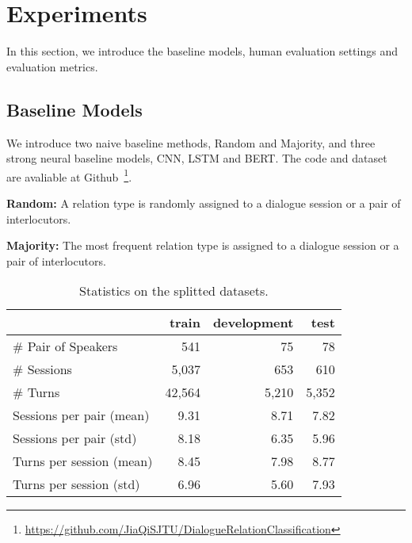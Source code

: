 \documentclass[letterpaper]{article} \usepackage{aaai21}  \usepackage{times}  \usepackage{helvet} \usepackage{courier}  \usepackage[hyphens]{url}  \usepackage{graphicx} \usepackage{xcolor}
\begin{document}
 
\section{Experiments}
\label{experiments}


In this section, we introduce the baseline models, human evaluation settings and evaluation metrics.




\subsection{Baseline Models}
\label{sec:baselines}
We introduce two naive baseline methods, Random and Majority, and three strong neural
baseline models, CNN, LSTM and BERT. 
The code and dataset are avaliable at Github~\footnote{\url{https://github.com/JiaQiSJTU/DialogueRelationClassification}}.

\textbf{Random:} A relation type is randomly assigned to a dialogue session or a pair of interlocutors.

\textbf{Majority:} The most frequent relation type is assigned to a dialogue session or a pair of interlocutors.


\begin{table}[h!]
	\centering
	\small
	\begin{tabular}{@{}lrrr@{}}
		\toprule[1.5pt]
		\textbf{}                				& \textbf{train} & \textbf{development} & \textbf{test} \\ 
		\hline
		\# Pair of Speakers      		  &   541     &  75     &   78  \\
		\# Sessions             			 &     5,037   &    653    &  610  \\
		\# Turns                			   &   42,564     &    5,210    &  5,352  \\
		Sessions per pair (mean)  	  &    9.31    &   8.71     &  7.82  \\
		Sessions per pair (std)        &    8.18    &   6.35     & 5.96   \\
		Turns per session (mean)    &    8.45     &   7.98     &   8.77 \\
		Turns per session (std)      &    6.96     &   5.60     &  7.93  \\
		\bottomrule[1.5pt]
		
	\end{tabular}
	\caption{Statistics on the splitted datasets.}\label{table:dataset}
\end{table}
\end{document}
